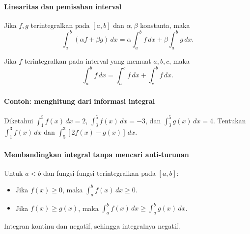 \documentclass{../../kalkulus-ppt}
\begin{document}
\begin{frame}
\frametitle{\insertsection}
\framesubtitle{Linearitas dan pemisahan interval}

\begin{teorema}
Jika $f,g$ terintegralkan pada $[a,b]$ dan $\alpha,\beta$ konstanta, maka
\[\int_a^b(\alpha f+\beta g)\,dx
=\alpha\int_a^b f\,dx+\beta\int_a^b g\,dx.\]
\end{teorema}
\begin{teorema}
Jika $f$ terintegralkan pada interval yang memuat $a,b,c$, maka
\[\int_a^b f\,dx=\int_a^c f\,dx+\int_c^b f\,dx.\]
\end{teorema}
\end{frame}

\begin{frame}
\frametitle{\insertsection}
\framesubtitle{Contoh: menghitung dari informasi integral}

\begin{contoh}
Diketahui $\displaystyle\int_1^5 f(x)\,dx=2$, $\displaystyle\int_3^5 f(x)\,dx=-3$, dan $\displaystyle\int_3^5 g(x)\,dx=4$.
Tentukan $\int_1^3 f(x)\,dx$ dan $\int_5^3[2f(x)-g(x)]\,dx$.
\end{contoh}
\end{frame}

\begin{frame}
\frametitle{\insertsection}
\framesubtitle{Membandingkan integral tanpa mencari anti-turunan}

\begin{teorema}
Untuk $a<b$ dan fungsi-fungsi terintegralkan pada $[a,b]$:
\begin{itemize}
\item Jika $f(x)\ge0$, maka $\int_a^b f(x)\,dx\ge0$.
\item Jika $f(x)\ge g(x)$, maka $\int_a^b f(x)\,dx\ge\int_a^b g(x)\,dx$.
\end{itemize}
\end{teorema}
Integran kontinu dan negatif, sehingga integralnya negatif.
\end{frame}
\end{document}
